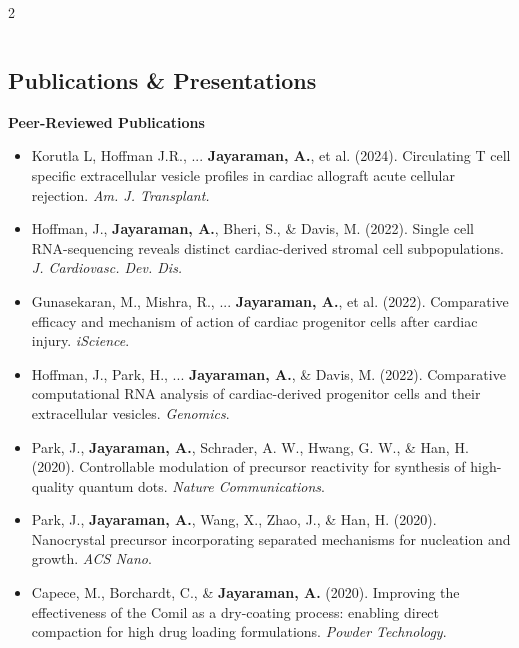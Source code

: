 \documentclass[letterpaper,11pt]{article}
\begin{document}
\begin{paracol}{2}
\begin{leftcolumn}
\begin{tabular}{p{0.33\linewidth} c}
\end{tabular}

\end{leftcolumn}
\switchcolumn

\begin{rightcolumn}
\section*{Publications \& Presentations}
\textbf{Peer-Reviewed Publications}
\begin{itemize}
    \item Korutla L, Hoffman J.R., ... \textbf{Jayaraman, A.}, et al. (2024). Circulating T cell specific extracellular vesicle profiles in cardiac allograft acute cellular rejection. \textit{Am. J. Transplant.}
    \item Hoffman, J., \textbf{Jayaraman, A.}, Bheri, S., \& Davis, M. (2022). Single cell RNA-sequencing reveals distinct cardiac-derived stromal cell subpopulations. \textit{J. Cardiovasc. Dev. Dis.}
    \item Gunasekaran, M., Mishra, R., ... \textbf{Jayaraman, A.}, et al. (2022). Comparative efficacy and mechanism of action of cardiac progenitor cells after cardiac injury. \textit{iScience}.
    \item Hoffman, J., Park, H., ... \textbf{Jayaraman, A.}, \& Davis, M. (2022). Comparative computational RNA analysis of cardiac-derived progenitor cells and their extracellular vesicles. \textit{Genomics}.
    \item Park, J., \textbf{Jayaraman, A.}, Schrader, A. W., Hwang, G. W., \& Han, H. (2020). Controllable modulation of precursor reactivity for synthesis of high-quality quantum dots. \textit{Nature Communications}.
    \item Park, J., \textbf{Jayaraman, A.}, Wang, X., Zhao, J., \& Han, H. (2020). Nanocrystal precursor incorporating separated mechanisms for nucleation and growth. \textit{ACS Nano}.
    \item Capece, M., Borchardt, C., \& \textbf{Jayaraman, A.} (2020). Improving the effectiveness of the Comil as a dry-coating process: enabling direct compaction for high drug loading formulations. \textit{Powder Technology}.
\end{itemize}


\end{rightcolumn}
\end{paracol}
\end{document}
